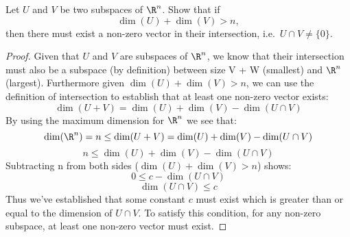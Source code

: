 \documentclass[11pt,nocut]{article}
\begin{document}
\vspace{1mm}

\begin{problem}[$\star$]
	Let $U$ and $V$ be two subspaces of $\R^n$. Show that if
	$$
	\dim(U) + \dim(V) > n,
	$$
	then there must exist a non-zero vector in their intersection, i.e.\ $U \cap V \neq \{0\}$.
\end{problem}
\begin{proof}
Given that $U$ and $V$ are subspaces of $\R^n$, we know that their intersection must also be a subspace (by definition) between size V + W (smallest) and $\R^n$ (largest). Furthermore given $\dim(U) + \dim(V) > n$, we can use the definition of intersection to establish that at least one non-zero vector exists:
$$
\dim(U + V) = \dim(U) + \dim(V) - \dim(U \cap V)
$$
By using the maximum dimension for $\R^n$ we see that:
$$
\dim(\R^n) = n \leq \dim(U + V) = \dim(U) + \dim(V) - \dim(U \cap V)
$$
$$
n \leq \dim(U) + \dim(V) - \dim(U \cap V)
$$
Subtracting n from both sides ($\dim(U) + \dim(V) > n$) shows:
$$
0 \leq c - \dim(U \cap V)
$$
$$
\dim(U \cap V) \leq c
$$
Thus we've established that some constant $c$ must exist which is greater than or equal to the dimension of $U \cap V$. To satisfy this condition, for any non-zero subspace, at least one non-zero vector must exist.
\end{proof}
\vspace{1cm}
\centerline{}
\end{document}
